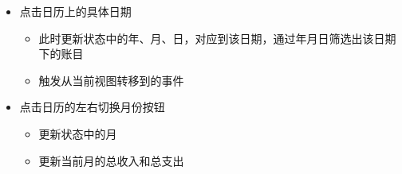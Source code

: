 \documentclass{article}
\begin{document}
\begin{itemize}[noitemsep,topsep=\mdcompacttopsep]%

\item{}点击日历上的具体日期

\begin{itemize}[noitemsep,topsep=\mdcompacttopsep]%

\item{}此时更新状态中的年、月、日，对应到该日期，通过年月日筛选出该日期下的账目%

\item{}触发从当前视图转移到的事件%
\end{itemize}%

\item{}点击日历的左右切换月份按钮

\begin{itemize}[noitemsep,topsep=\mdcompacttopsep]%

\item{}更新状态中的月%

\item{}更新当前月的总收入和总支出%
\end{itemize}%
\end{itemize}%
\end{document}
